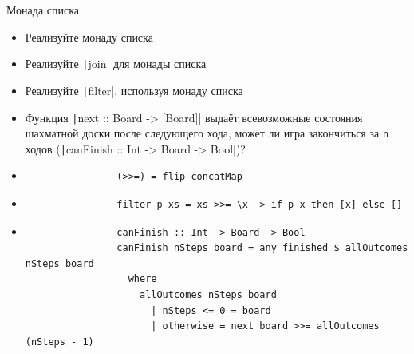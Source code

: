     \begin{frame}[fragile]{Монада списка}
        \begin{itemize}
            \item[\todo] Реализуйте монаду списка
            \item[\todo] Реализуйте \texttt|join| для монады списка
            \item[\todo] Реализуйте \texttt|filter|, используя монаду списка
            \item[\todo] Функция \texttt|next :: Board -> [Board]| выдаёт всевозможные состояния шахматной доски после следующего хода, может ли игра закончиться за \texttt{n} ходов (\texttt|canFinish :: Int -> Board -> Bool|)?
            \item[\answer] \pause
            \begin{verbatim}
                (>>=) = flip concatMap
            \end{verbatim}
            \item[\answer] \pause
            \begin{verbatim}
                filter p xs = xs >>= \x -> if p x then [x] else []
            \end{verbatim}
            \item[\answer] \pause
            \begin{verbatim}
                canFinish :: Int -> Board -> Bool
                canFinish nSteps board = any finished $ allOutcomes nSteps board
                  where
                    allOutcomes nSteps board
                      | nSteps <= 0 = board
                      | otherwise = next board >>= allOutcomes (nSteps - 1)
            \end{verbatim}
        \end{itemize}
    \end{frame}
    
